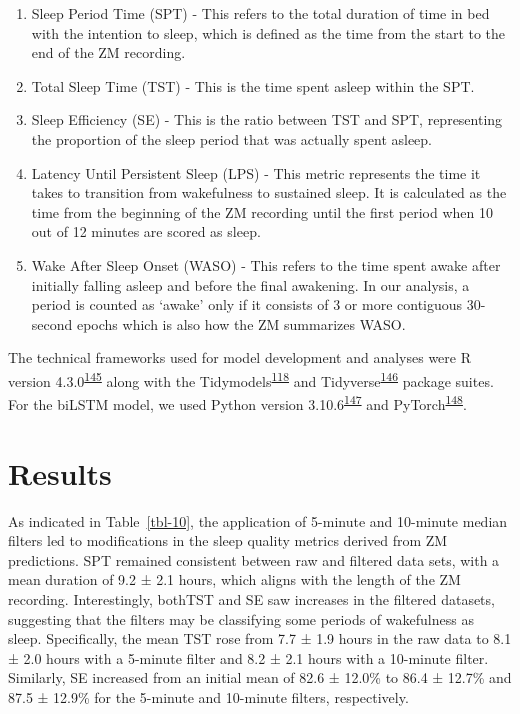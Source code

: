 \documentclass[
  9pt,
]{scrbook}
\providecommand{\tightlist}{%
  \setlength{\itemsep}{0pt}\setlength{\parskip}{0pt}}\usepackage{longtable,booktabs,array}
\begin{document}
\begin{enumerate}
\def\labelenumi{\arabic{enumi}.}
\tightlist
\item
  Sleep Period Time (SPT) - This refers to the total duration of time in
  bed with the intention to sleep, which is defined as the time from the
  start to the end of the ZM recording.
\item
  Total Sleep Time (TST) - This is the time spent asleep within the SPT.
\item
  Sleep Efficiency (SE) - This is the ratio between TST and SPT,
  representing the proportion of the sleep period that was actually
  spent asleep.
\item
  Latency Until Persistent Sleep (LPS) - This metric represents the time
  it takes to transition from wakefulness to sustained sleep. It is
  calculated as the time from the beginning of the ZM recording until
  the first period when 10 out of 12 minutes are scored as sleep.
\item
  Wake After Sleep Onset (WASO) - This refers to the time spent awake
  after initially falling asleep and before the final awakening. In our
  analysis, a period is counted as `awake' only if it consists of 3 or
  more contiguous 30-second epochs which is also how the ZM summarizes
  WASO.
\end{enumerate}

The technical frameworks used for model development and analyses were R
version
4.3.0\textsuperscript{\protect\hyperlink{ref-rcoreteam_2023}{145}} along
with the
Tidymodels\textsuperscript{\protect\hyperlink{ref-kuhn_tidymodels_2020}{118}}
and
Tidyverse\textsuperscript{\protect\hyperlink{ref-wickham_tidyverse_2019}{146}}
package suites. For the biLSTM model, we used Python version
3.10.6\textsuperscript{\protect\hyperlink{ref-vanrossum_python_2009}{147}}
and
PyTorch\textsuperscript{\protect\hyperlink{ref-paszke_pytorch_2019}{148}}.

\hypertarget{results-2}{%
\section{Results}\label{results-2}}

As indicated in Table~\ref{tbl-10}, the application of 5-minute and
10-minute median filters led to modifications in the sleep quality
metrics derived from ZM predictions. SPT remained consistent between raw
and filtered data sets, with a mean duration of 9.2 ± 2.1 hours, which
aligns with the length of the ZM recording. Interestingly, bothTST and
SE saw increases in the filtered datasets, suggesting that the filters
may be classifying some periods of wakefulness as sleep. Specifically,
the mean TST rose from 7.7 ± 1.9 hours in the raw data to 8.1 ± 2.0
hours with a 5-minute filter and 8.2 ± 2.1 hours with a 10-minute
filter. Similarly, SE increased from an initial mean of 82.6 ± 12.0\% to
86.4 ± 12.7\% and 87.5 ± 12.9\% for the 5-minute and 10-minute filters,
respectively.
\end{document}
